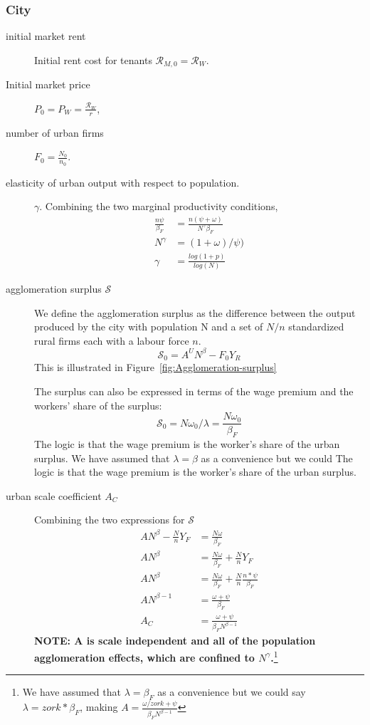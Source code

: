 \subsubsection{City}
\begin{description}
\item [initial market rent] 
Initial rent cost for tenants  $\mathcal{R}_{M, 0}= \mathcal{R}_W$.


\item [Initial market price] 
$P_0= P_W=\frac{\mathcal{R}_W }{r}$,  

\item[number of urban firms]  $F_0=\frac{N_0}{n_0}$. %

\item[elasticity of urban output with respect to population.] $\gamma$. Combining the two marginal productivity conditions, 
\begin{align}
\frac{n\psi}{\beta_F}  &= \frac{n(\psi+\omega)}{N^\gamma \beta_F}  \\
N^\gamma &= (1+\omega)/\psi)\\
\gamma &= \frac{log(1+p)}{log(N)}
\end{align}

\item [agglomeration surplus $\mathcal{S}$] We define the agglomeration surplus as the difference between the output produced by  the city with population N and a set of $N/n$ standardized rural firms each with a labour force $n$. 
\[\mathcal{S_0}=A^U N^\beta-F_0Y_R \] 
This is illustrated in Figure~\ref{fig:Agglomeration-surplus}

The surplus can also be expressed in terms of the wage premium and the workers' share of the surplus:
\[\mathcal{S_0}=N\omega_0/\lambda=\frac{N\omega_0}{\beta_F}\] 
The logic is that the wage premium is the worker's share of the urban surplus. We have assumed that $\lambda=\beta$ as a convenience but we could 
The logic is that the wage premium is the worker's share of the urban surplus. 

\item[urban scale coefficient $A_C$] Combining the two expressions for $\mathcal{S}$
\begin{align*}
 AN^\beta-\frac{N}{n}Y_F    &=\frac{N\omega}{\beta_F}\\ 
 AN^\beta   &=\frac{N\omega}{\beta_F} + \frac{N}{n}Y_F \\
 AN^\beta   &=\frac{N\omega}{\beta_F} + \frac{N}{n}\frac{n*\psi}{\beta_F}\\
AN^{\beta-1}   &=\frac{\omega+\psi}{\beta_F}\\ 
  A_C&=\frac{\omega+\psi}{\beta_FN^{\beta-1}}
\end{align*}
\textbf{NOTE: A is scale independent and all of the population agglomeration effects, which are confined to $N^\gamma$.}\footnote{We have assumed that $\lambda=\beta_F$ as a convenience but we could say $\lambda=zork*\beta_F$, making $A=\frac{\omega/zork +\psi}{\beta_FN^{\beta-1}}$ }
\end{description}


